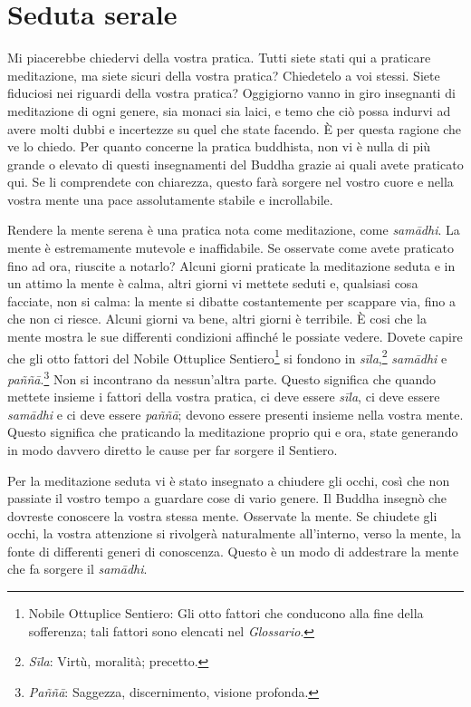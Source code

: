 \chapter{Seduta serale}

Mi piacerebbe chiedervi della vostra pratica. Tutti siete stati qui a
praticare meditazione, ma siete sicuri della vostra pratica? Chiedetelo
a voi stessi. Siete fiduciosi nei riguardi della vostra pratica?
Oggigiorno vanno in giro insegnanti di meditazione di ogni genere, sia
monaci sia laici, e temo che ciò possa indurvi ad avere molti dubbi e
incertezze su quel che state facendo. È per questa ragione che ve lo
chiedo. Per quanto concerne la pratica buddhista, non vi è nulla di più
grande o elevato di questi insegnamenti del Buddha grazie ai quali avete
praticato qui. Se li comprendete con chiarezza, questo farà sorgere nel
vostro cuore e nella vostra mente una pace assolutamente stabile e
incrollabile.

Rendere la mente serena è una pratica nota come meditazione, come
\emph{samādhi}. La mente è estremamente mutevole e inaffidabile. Se
osservate come avete praticato fino ad ora, riuscite a notarlo? Alcuni
giorni praticate la meditazione seduta e in un attimo la mente è calma,
altri giorni vi mettete seduti e, qualsiasi cosa facciate, non si calma:
la mente si dibatte costantemente per scappare via, fino a che non ci
riesce. Alcuni giorni va bene, altri giorni è terribile. È cosi che la
mente mostra le sue differenti condizioni affinché le possiate vedere.
Dovete capire che gli otto fattori del Nobile Ottuplice
Sentiero\footnote{Nobile Ottuplice Sentiero: Gli otto fattori che
  conducono alla fine della sofferenza; tali fattori sono elencati nel
  \emph{Glossario}.} si fondono in \emph{sīla},\footnote{\emph{Sīla}:
  Virtù, moralità; precetto.} \emph{samādhi} e \emph{paññā}.\footnote{\emph{Paññā}:
  Saggezza, discernimento, visione profonda.} Non si incontrano da
nessun'altra parte. Questo significa che quando mettete insieme i
fattori della vostra pratica, ci deve essere \emph{sīla}, ci deve essere
\emph{samādhi} e ci deve essere \emph{paññā}; devono essere presenti
insieme nella vostra mente. Questo significa che praticando la
meditazione proprio qui e ora, state generando in modo davvero diretto
le cause per far sorgere il Sentiero.

Per la meditazione seduta vi è stato insegnato a chiudere gli occhi,
così che non passiate il vostro tempo a guardare cose di vario genere.
Il Buddha insegnò che dovreste conoscere la vostra stessa mente.
Osservate la mente. Se chiudete gli occhi, la vostra attenzione si
rivolgerà naturalmente all'interno, verso la mente, la fonte di
differenti generi di conoscenza. Questo è un modo di addestrare la mente
che fa sorgere il \emph{samādhi}.

